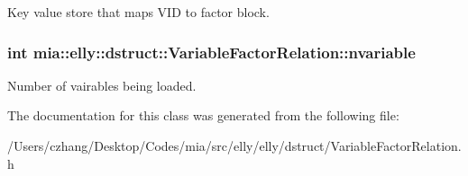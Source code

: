 Key value store that maps V\-I\-D to factor block. \hypertarget{classmia_1_1elly_1_1dstruct_1_1_variable_factor_relation_ac3f1f9186a88af83b82868b4077ccdc2}{
\subsubsection[{nvariable}]{\setlength{\rightskip}{0pt plus 5cm}int mia\-::elly\-::dstruct\-::\-Variable\-Factor\-Relation\-::nvariable}}\label{classmia_1_1elly_1_1dstruct_1_1_variable_factor_relation_ac3f1f9186a88af83b82868b4077ccdc2}
Number of vairables being loaded. 

The documentation for this class was generated from the following file\-:\begin{DoxyCompactItemize}
\item 
/\-Users/czhang/\-Desktop/\-Codes/mia/src/elly/elly/dstruct/Variable\-Factor\-Relation.\-h\end{DoxyCompactItemize}
